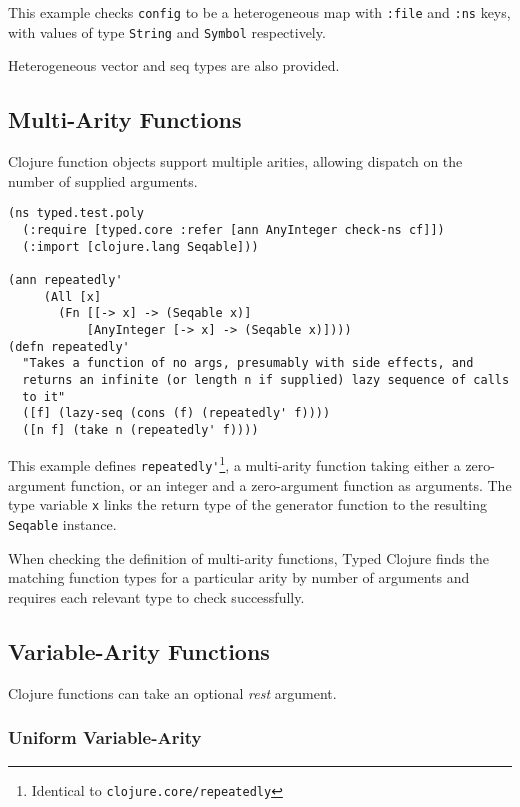 This example checks \lstinline|config| to be a heterogeneous map
with \lstinline|:file| and \lstinline|:ns| keys, with values of
type \lstinline|String| and \lstinline|Symbol| respectively.

Heterogeneous vector and seq types are also provided.

\subsection{Multi-Arity Functions}

Clojure function objects support multiple arities, allowing dispatch
on the number of supplied arguments.

\begin{lstlisting}
(ns typed.test.poly
  (:require [typed.core :refer [ann AnyInteger check-ns cf]])
  (:import [clojure.lang Seqable]))

(ann repeatedly'
     (All [x]
       (Fn [[-> x] -> (Seqable x)]
           [AnyInteger [-> x] -> (Seqable x)])))
(defn repeatedly'
  "Takes a function of no args, presumably with side effects, and
  returns an infinite (or length n if supplied) lazy sequence of calls
  to it"
  ([f] (lazy-seq (cons (f) (repeatedly' f))))
  ([n f] (take n (repeatedly' f))))
\end{lstlisting}

This example defines \lstinline|repeatedly'|\footnote{Identical to \lstinline|clojure.core/repeatedly|},
a multi-arity function taking either a zero-argument function, or an integer and a zero-argument function as arguments.
The type variable \lstinline|x| links the return type of the generator function to
the resulting \lstinline|Seqable| instance.

When checking the definition of multi-arity functions, Typed Clojure
finds the matching function types for a particular arity by number of arguments
and requires each relevant type to check successfully.

\subsection{Variable-Arity Functions}

Clojure functions can take an optional \emph{rest} argument.

\subsubsection{Uniform Variable-Arity}

